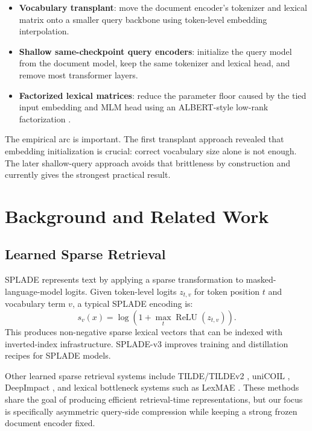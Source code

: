 \documentclass[
]{ceurart}
\begin{document}
\begin{itemize}
  \item \textbf{Vocabulary transplant}: move the document encoder's tokenizer
  and lexical matrix onto a smaller query backbone using token-level embedding
  interpolation.
  \item \textbf{Shallow same-checkpoint query encoders}: initialize the query
  model from the document model, keep the same tokenizer and lexical head, and
  remove most transformer layers.
  \item \textbf{Factorized lexical matrices}: reduce the parameter floor caused
  by the tied input embedding and MLM head using an ALBERT-style low-rank
  factorization \cite{Lan2020ALBERT}.
\end{itemize}

The empirical arc is important. The first transplant approach revealed that
embedding initialization is crucial: correct vocabulary size alone is not
enough. The later shallow-query approach avoids that brittleness by construction
and currently gives the strongest practical result.

\section{Background and Related Work}

\subsection{Learned Sparse Retrieval}

SPLADE \cite{Formal2021SPLADE,Formal2022SPLADEv2} represents text by applying a
sparse transformation to masked-language-model logits. Given token-level logits
$z_{t,v}$ for token position $t$ and vocabulary term $v$, a typical SPLADE
encoding is:
\begin{equation}
  s_v(x) = \log(1 + \max_t \operatorname{ReLU}(z_{t,v})).
\end{equation}
This produces non-negative sparse lexical vectors that can be indexed with
inverted-index infrastructure. SPLADE-v3 \cite{Lassance2024SPLADEv3} improves
training and distillation recipes for SPLADE models.

Other learned sparse retrieval systems include TILDE/TILDEv2
\cite{Zhuang2021TILDE}, uniCOIL \cite{Lin2021UniCOIL}, DeepImpact
\cite{Mallia2021DeepImpact}, and lexical bottleneck systems such as LexMAE
\cite{Shen2023LexMAE}. These methods share the goal of producing efficient
retrieval-time representations, but our focus is specifically asymmetric
query-side compression while keeping a strong frozen document encoder fixed.
\end{document}
